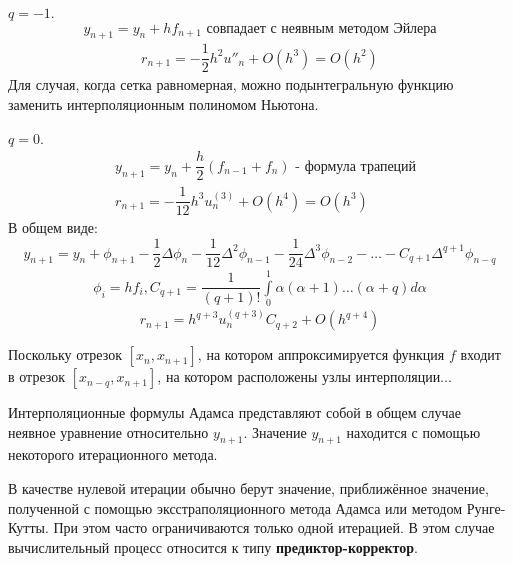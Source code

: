 \begin{examples}
  \item $q = -1$.
  \begin{equation}
    y_{n + 1} = y_n + h f_{n + 1} \text{ совпадает с неявным методом Эйлера}
  \end{equation}
  \begin{align*}
    r_{n + 1} = -\dfrac{1}{2}h^2u''_n + O(h^3) = O(h^2)
  \end{align*}
  Для случая, когда сетка равномерная, можно подынтегральную функцию заменить
  интерполяционным полиномом Ньютона.
  \item $q = 0$.
  \begin{align}
    &y_{n + 1} = y_n + \dfrac{h}{2}(f_{n - 1} + f_n) \text{ - формула трапеций}\\
    \nonumber
    &r_{n + 1} = -\dfrac{1}{12}h^3u_n^{(3)} + O(h^4) = O(h^3)
  \end{align}
  В общем виде:
  \begin{equation}
    y_{n + 1} = y_n + \phi_{n + 1} - \dfrac{1}{2}\Delta\phi_n - \dfrac{1}{12}
    \Delta^2\phi_{n - 1} - \dfrac{1}{24}\Delta^3\phi_{n - 2} - \ldots
    - C_{q + 1}\Delta^{q + 1}\phi_{n - q}
  \end{equation}
  \begin{align*}
    \phi_i = hf_i, C_{q + 1} = \dfrac{1}{(q + 1)!}\int\limits_0^1\alpha
    (\alpha + 1)\ldots(\alpha + q)d\alpha
  \end{align*}
  \begin{equation}
    r_{n + 1} = h^{q + 3}u_n^{(q + 3)}C_{q + 2} + O(h^{q + 4})
  \end{equation}
\end{examples}

Поскольку отрезок $[x_n, x_{n + 1}]$, на котором аппроксимируется функция $f$
входит в отрезок $[x_{n - q}, x_{n + 1}]$, на котором расположены узлы интерполяции...

Интерполяционные формулы Адамса представляют собой в общем случае неявное
уравнение относительно $y_{n + 1}$. Значение $y_{n + 1}$ находится с помощью
некоторого итерационного метода.

В качестве нулевой итерации обычно берут значение, приближённое значение,
полученной с помощью эксстраполяционного метода Адамса или методом Рунге-Кутты.
При этом часто ограничиваются только одной итерацией. В этом случае вычислительный
процесс относится к типу \textbf{предиктор-корректор}.
